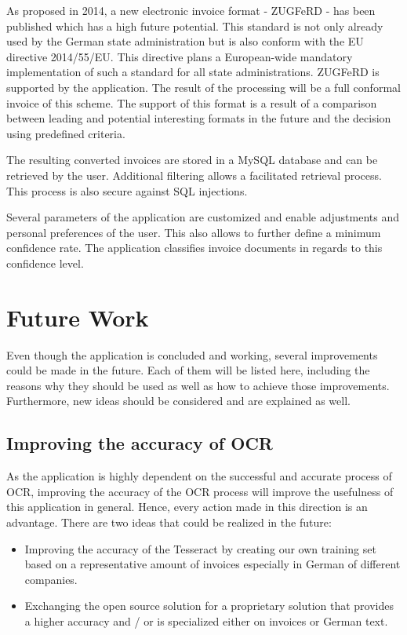 As proposed in 2014, a new electronic invoice format - ZUGFeRD - has been published which has a high future potential\cite{Ferd14}. This standard is not only already used by the German state administration but is also conform with the EU directive 2014/55/EU. This directive plans a European-wide mandatory implementation of such a standard for all state administrations. 
ZUGFeRD is supported by the application. The result of the processing will be a full conformal invoice of this scheme. The support of this format is a result of a comparison between leading and potential interesting formats in the future and the decision using predefined criteria.

The resulting converted invoices are stored in a MySQL database and can be retrieved by the user. Additional filtering allows a facilitated retrieval process. This process is also secure against SQL injections.

Several parameters of the application are customized and enable adjustments and personal preferences of the user. This also allows to further define a minimum confidence rate. The application classifies invoice documents in regards to this confidence level.

\section{Future Work}
\label{sec6.3}
Even though the application is concluded and working, several improvements could be made in the future.
Each of them will be listed here, including the reasons why they should be used as well as how to achieve those improvements. Furthermore, new ideas should be considered and are explained as well.

\subsection{Improving the accuracy of OCR} 
As the application is highly dependent on the successful and accurate process of OCR, improving the accuracy of the OCR process will improve the usefulness of this application in general. Hence, every action made in this direction is an advantage. There are two ideas that could be realized in the future: 
	\begin{itemize}
		\item Improving the accuracy of the Tesseract by creating our own training set based on a representative amount of invoices especially in German of different companies. 
		\item Exchanging the open source solution for a proprietary solution that provides a higher accuracy and / or is specialized either on invoices or German text.
	\end{itemize}

